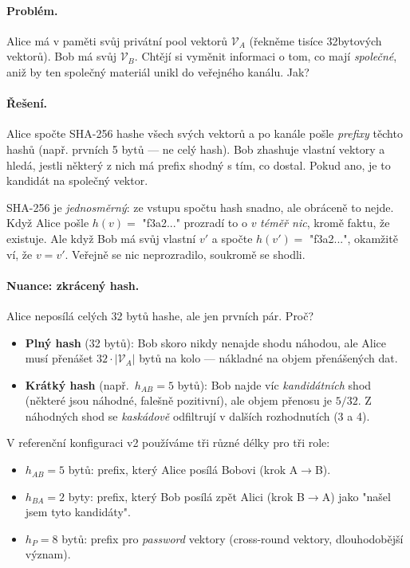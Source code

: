 \documentclass[11pt,a4paper]{article}
\begin{document}
\paragraph{Problém.} Alice má v paměti svůj privátní pool vektorů $\mathcal{V}_A$ (řekněme tisíce 32bytových vektorů). Bob má svůj $\mathcal{V}_B$. Chtějí si vyměnit informaci o tom, co mají \emph{společné}, aniž by ten společný materiál unikl do veřejného kanálu. Jak?

\paragraph{Řešení.} Alice spočte SHA-256 hashe všech svých vektorů a po kanále pošle \emph{prefixy} těchto hashů (např. prvních 5 bytů --- ne celý hash). Bob zhashuje vlastní vektory a hledá, jestli některý z nich má prefix shodný s tím, co dostal. Pokud ano, je to kandidát na společný vektor.

\begin{aha}
SHA-256 je \emph{jednosměrný}: ze vstupu spočtu hash snadno, ale obráceně to nejde. Když Alice pošle $h(v) = $ "f3a2..." prozradí to o $v$ \emph{téměř nic}, kromě faktu, že existuje. Ale když Bob má svůj vlastní $v'$ a spočte $h(v') = $ "f3a2...", okamžitě ví, že $v = v'$. Veřejně se nic neprozradilo, soukromě se shodli.
\end{aha}

\paragraph{Nuance: zkrácený hash.} Alice neposílá celých 32 bytů hashe, ale jen prvních pár. Proč?

\begin{itemize}[leftmargin=*]
\item \textbf{Plný hash} (32 bytů): Bob skoro nikdy nenajde shodu náhodou, ale Alice musí přenášet $32 \cdot |\mathcal{V}_A|$ bytů na kolo --- nákladné na objem přenášených dat.
\item \textbf{Krátký hash} (např.\ $h_{AB} = 5$ bytů): Bob najde víc \emph{kandidátních} shod (některé jsou náhodné, falešně pozitivní), ale objem přenosu je $5/32$. Z náhodných shod se \emph{kaskádově} odfiltrují v dalších rozhodnutích (3 a 4).
\end{itemize}

V referenční konfiguraci v2 používáme tři různé délky pro tři role:
\begin{itemize}[leftmargin=*]
\item $h_{AB} = 5$ bytů: prefix, který Alice posílá Bobovi (krok A$\to$B).
\item $h_{BA} = 2$ byty: prefix, který Bob posílá zpět Alici (krok B$\to$A) jako "našel jsem tyto kandidáty".
\item $h_P = 8$ bytů: prefix pro \emph{password} vektory (cross-round vektory, dlouhodobější význam).
\end{itemize}
\end{document}
